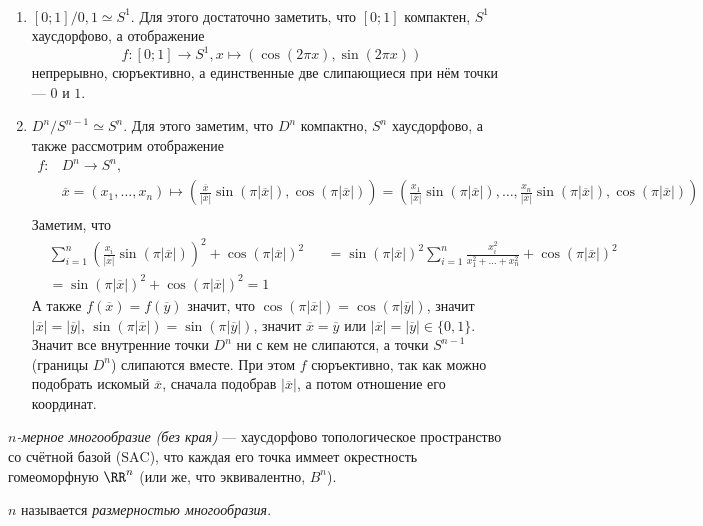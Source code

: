 \documentclass[12pt,a4paper]{article}
\newcommand{\SAC}{\ensuremath{\mathrm{SAC}}\xspace}
\begin{document}
    \begin{example}\ 
        \begin{enumerate}
            \item $[0; 1]/{0, 1} \simeq S^1$. Для этого достаточно заметить, что $[0; 1]$ компактен, $S^1$ хаусдорфово, а отображение
            \[f: [0; 1] \to S^1, x \mapsto (\cos(2\pi x), \sin(2\pi x))\]
            непрерывно, сюръективно, а единственные две слипающиеся при нём точки --- $0$ и $1$.
            \item $D^n/S^{n-1} \simeq S^n$. Для этого заметим, что $D^n$ компактно, $S^n$ хаусдорфово, а также рассмотрим отображение
            \begin{align*}
                f: {}&D^n \to S^n,\\
                &\overline{x} = (x_1, \dots, x_n) \mapsto \left(\frac{\overline{x}}{|\overline{x}|} \sin(\pi |\overline{x}|), \cos(\pi |\overline{x}|)\right) = \left(\frac{x_1}{|\overline{x}|} \sin(\pi |\overline{x}|), \dots, \frac{x_n}{|\overline{x}|} \sin(\pi |\overline{x}|), \cos(\pi |\overline{x}|)\right)\\
            \end{align*}
            Заметим, что
            \begin{align*}
                &\sum_{i=1}^n \left(\frac{x_i}{|\overline{x}|}\sin(\pi |\overline{x}|)\right)^2 + \cos(\pi |\overline{x}|)^2&
                &= \sin(\pi |\overline{x}|)^2 \sum_{i=1}^n \frac{x_i^2}{x_1^2 + \dots + x_n^2} + \cos(\pi |\overline{x}|)^2\\
                &= \sin(\pi |\overline{x}|)^2 + \cos(\pi |\overline{x}|)^2 = 1
            \end{align*}
            А также $f(\overline{x}) = f(\overline{y})$ значит, что $\cos(\pi |\overline{x}|) = \cos(\pi |\overline{y}|)$, значит $|\overline{x}| = |\overline{y}|$, $\sin(\pi |\overline{x}|) = \sin(\pi |\overline{y}|)$, значит $\overline{x} = \overline{y}$ или $|\overline{x}| = |\overline{y}| \in \{0, 1\}$. Значит все внутренние точки $D^n$ ни с кем не слипаются, а точки $S^{n-1}$ (границы $D^n$) слипаются вместе. При этом $f$ сюръективно, так как можно подобрать искомый $\overline{x}$, сначала подобрав $|\overline{x}|$, а потом отношение его координат.
        \end{enumerate}
    \end{example}

    \begin{definition}
        \emph{$n$-мерное многообразие (без края)} --- хаусдорфово топологическое пространство со счётной базой (\SAC), что каждая его точка иммеет окрестность гомеоморфную $\RR^n$ (или же, что эквивалентно, $B^n$).

        $n$ называется \emph{размерностью многообразия}.
    \end{definition}
\end{document}

